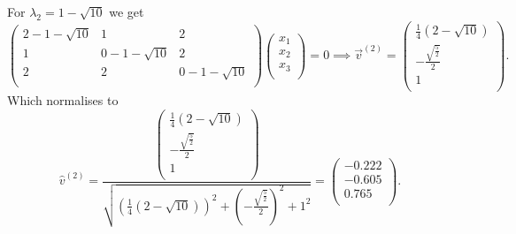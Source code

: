 \begin{derivation}
   For $\lambda_2 = 1 - \sqrt{10}$ we get
   \begin{equation*}
     \begin{pmatrix}
       2 - 1 - \sqrt{10} & 1 & 2\\
     1 & 0 - 1 - \sqrt{10} & 2\\
     2 & 2 & 0 - 1 - \sqrt{10}\\
     \end{pmatrix} \begin{pmatrix}
       x_1\\
     x_2\\
     x_3\\
     \end{pmatrix} = 0 \implies \Vec{v}^{(2)} = \begin{pmatrix}
       \frac{1}{4} \left( 2 - \sqrt{10} \right)\\
     - \frac{\sqrt{\frac{5}{2}}}{2}\\
     1\\
     \end{pmatrix}
   .\end{equation*}
   Which normalises to
   \begin{equation*}
     \hat{v}^{(2)} = \frac{\begin{pmatrix}
       \frac{1}{4}(2 - \sqrt{10})\\
     - \frac{\sqrt{\frac{5}{2}}}{2}\\
     1\\
     \end{pmatrix}}{\sqrt{\left( \frac{1}{4} \left( 2 - \sqrt{10} \right) \right)^2 + \left( - \frac{\sqrt{\frac{5}{2}}}{2} \right)^2 + 1^2}} = \begin{pmatrix}
       \num{-0,222} \\
     \num{-0,605} \\
     \num{0,765} \\
     \end{pmatrix}
   .\end{equation*}


\end{derivation}
